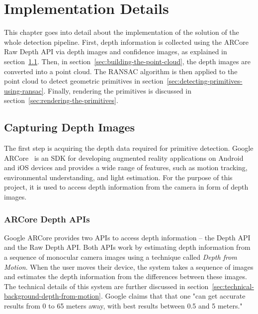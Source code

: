\chapter{Implementation Details}

This chapter goes into detail about the implementation of the solution of the whole detection pipeline.
First, depth information is collected using the ARCore Raw Depth API via depth images and confidence images, as explained in section~\ref{sec:capturing-depth-images}.
Then, in section~\ref{sec:building-the-point-cloud}, the depth images are converted into a point cloud.
The RANSAC algorithm is then applied to the point cloud to detect geometric primitives in section~\ref{sec:detecting-primitives-using-ransac}.
Finally, rendering the primitives is discussed in section~\ref{sec:rendering-the-primitives}.

%


\section{Capturing Depth Images}\label{sec:capturing-depth-images}
The first step is acquiring the depth data required for primitive detection.
Google ARCore~\parencite{google_llc_arcore_doc} is an SDK for developing augmented reality applications on Android and iOS devices
and provides a wide range of features, such as motion tracking, environmental understanding, and light estimation.
For the purpose of this project, it is used to access depth information from the camera in form of depth images.

\subsection{ARCore Depth APIs}
Google ARCore provides two APIs to access depth information -- the Depth API and the Raw Depth API\@.
Both APIs work by estimating depth information from a sequence of monocular camera images using
a technique called \textit{Depth from Motion}.
When the user moves their device, the system takes a sequence of images and estimates the depth information from the differences between these images.
The technical details of this system are further discussed in section~\ref{sec:technical-background-depth-from-motion}.
Google claims that that one "can get accurate results from 0 to 65 meters away,
with best results between 0.5 and 5 meters."~\parencite{google_llc_arcore_doc}

